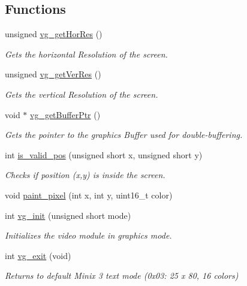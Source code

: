 \subsection*{Functions}
\begin{DoxyCompactItemize}
\item 
unsigned \hyperlink{group__video__gr_gab3938dd22c03335341584d5b8f6752f5}{vg\+\_\+get\+Hor\+Res} ()
\begin{DoxyCompactList}\small\item\em Gets the horizontal Resolution of the screen. \end{DoxyCompactList}\item 
unsigned \hyperlink{group__video__gr_gaab8200f7947926322b6dd6fa7c6da1e1}{vg\+\_\+get\+Ver\+Res} ()
\begin{DoxyCompactList}\small\item\em Gets the vertical Resolution of the screen. \end{DoxyCompactList}\item 
void $\ast$ \hyperlink{group__video__gr_gabd51eef0a4ffcafb6a08fb40703f4383}{vg\+\_\+get\+Buffer\+Ptr} ()
\begin{DoxyCompactList}\small\item\em Gets the pointer to the graphics Buffer used for double-\/buffering. \end{DoxyCompactList}\item 
int \hyperlink{group__video__gr_ga7f93731e89220a67419a16b1a415e133}{is\+\_\+valid\+\_\+pos} (unsigned short x, unsigned short y)
\begin{DoxyCompactList}\small\item\em Checks if position (x,y) is inside the screen. \end{DoxyCompactList}\item 
void \hyperlink{group__video__gr_gafd0836c92e142e75c256799fb45032da}{paint\+\_\+pixel} (int x, int y, uint16\+\_\+t color)
\item 
int \hyperlink{group__video__gr_ga7d19c24f10ca7bfb2c7b8f9e12d4dc6f}{vg\+\_\+init} (unsigned short mode)
\begin{DoxyCompactList}\small\item\em Initializes the video module in graphics mode. \end{DoxyCompactList}\item 
int \hyperlink{group__video__gr_ga42f593e6656f1a978315aff02b1bcebf}{vg\+\_\+exit} (void)
\begin{DoxyCompactList}\small\item\em Returns to default Minix 3 text mode (0x03\+: 25 x 80, 16 colors) \end{DoxyCompactList}\item 

\end{DoxyCompactItemize}
